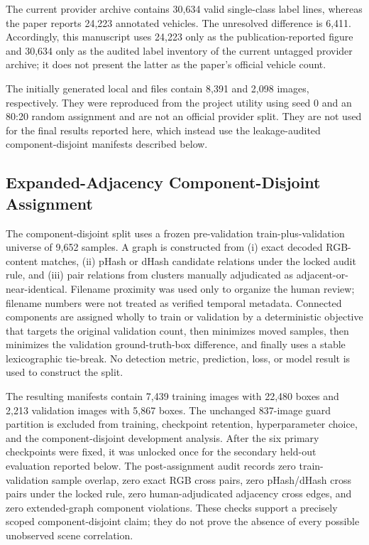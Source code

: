 The current provider archive contains 30,634 valid single-class label lines, whereas the paper reports 24,223 annotated vehicles. The unresolved difference is 6,411. Accordingly, this manuscript uses 24,223 only as the publication-reported figure and 30,634 only as the audited label inventory of the current untagged provider archive; it does not present the latter as the paper's official vehicle count.

The initially generated local  and  files contain 8,391 and 2,098 images, respectively. They were reproduced from the project utility using seed 0 and an 80:20 random assignment and are not an official provider split. They are not used for the final results reported here, which instead use the leakage-audited component-disjoint manifests described below.

\subsection{Expanded-Adjacency Component-Disjoint Assignment}
The component-disjoint split uses a frozen pre-validation train-plus-validation universe of 9,652 samples. A graph is constructed from (i) exact decoded RGB-content matches, (ii) pHash or dHash candidate relations under the locked audit rule, and (iii) pair relations from clusters manually adjudicated as adjacent-or-near-identical. Filename proximity was used only to organize the human review; filename numbers were not treated as verified temporal metadata. Connected components are assigned wholly to train or validation by a deterministic objective that targets the original validation count, then minimizes moved samples, then minimizes the validation ground-truth-box difference, and finally uses a stable lexicographic tie-break. No detection metric, prediction, loss, or model result is used to construct the split.

The resulting manifests contain 7,439 training images with 22,480 boxes and 2,213 validation images with 5,867 boxes. The unchanged 837-image guard partition is excluded from training, checkpoint retention, hyperparameter choice, and the component-disjoint development analysis. After the six primary checkpoints were fixed, it was unlocked once for the secondary held-out evaluation reported below. The post-assignment audit records zero train-validation sample overlap, zero exact RGB cross pairs, zero pHash/dHash cross pairs under the locked rule, zero human-adjudicated adjacency cross edges, and zero extended-graph component violations. These checks support a precisely scoped component-disjoint claim; they do not prove the absence of every possible unobserved scene correlation.


